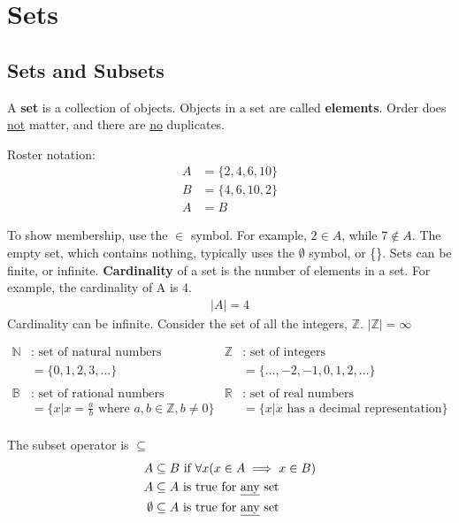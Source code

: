 \section{Sets}
\subsection{Sets and Subsets}

A \textbf{set} is a collection of objects. Objects in a set are called \textbf{elements}.
Order does \underline{not} matter, and there are \underline{no} duplicates.

Roster notation:
\begin{align*}
  A & = \{2, 4, 6, 10\} \\
  B & = \{4, 6, 10, 2\} \\
  A & = B
\end{align*}

To show membership, use the $\in$ symbol. For example, $2 \in A$, while $7 \not \in A$.
The empty set, which contains nothing, typically uses the $\emptyset$ symbol, or \{\}.
Sets can be finite, or infinite. \textbf{Cardinality} of a set is the number of elements in a set.
For example, the cardinality of A is 4.
\begin{align*}
  \left\lvert A\right\rvert = 4
\end{align*}
Cardinality can be infinite. Consider the set of all the integers, $\mathbb{Z}$. $\left\lvert \mathbb{Z}\right\rvert = \infty$

\begin{align*}
  \mathbb{N} & : \text{ set of natural numbers}                                         & \mathbb{Z} & : \text{ set of integers}                        \\
             & = \{0, 1, 2, 3, \ldots\}                                                 &            & = \{\ldots, -2, -1, 0, 1, 2, \ldots\}            \\
  \\
  \mathbb{B} & : \text{ set of rational numbers}                                        & \mathbb{R} & : \text{ set of real numbers}                    \\
             & = \{x | x = \frac{a}{b} \text{ where } a, b \in \mathbb{Z}, b \not = 0\} &            & = \{x | x \text{ has a decimal representation}\} \\
\end{align*}

The subset operator is $\subseteq$
\begin{align*}
  A         & \subseteq B \text{  if } \forall x (x \in A \implies x \in B) \\
  A         & \subseteq A \text{  is true for \underline{any} set}          \\
  \emptyset & \subseteq A \text{ is true for \underline{any} set}
\end{align*}

